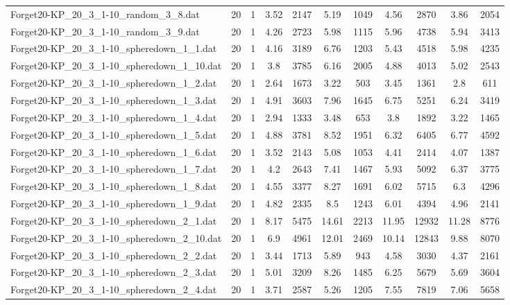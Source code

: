 \begin{table}[!ht]
\begin{tabular}{lcccccccccc}
Forget20-KP\_20\_3\_1-10\_random\_3\_8.dat & 20 & 1 & 3.52 & 2147 & 5.19 & 1049 & 4.56 & 2870 & 3.86 & 2054 \\
Forget20-KP\_20\_3\_1-10\_random\_3\_9.dat & 20 & 1 & 4.26 & 2723 & 5.98 & 1115 & 5.96 & 4738 & 5.94 & 3413 \\
Forget20-KP\_20\_3\_1-10\_spheredown\_1\_1.dat & 20 & 1 & 4.16 & 3189 & 6.76 & 1203 & 5.43 & 4518 & 5.98 & 4235 \\
Forget20-KP\_20\_3\_1-10\_spheredown\_1\_10.dat & 20 & 1 & 3.8 & 3785 & 6.16 & 2005 & 4.88 & 4013 & 5.02 & 2543 \\
Forget20-KP\_20\_3\_1-10\_spheredown\_1\_2.dat & 20 & 1 & 2.64 & 1673 & 3.22 & 503 & 3.45 & 1361 & 2.8 & 611 \\
Forget20-KP\_20\_3\_1-10\_spheredown\_1\_3.dat & 20 & 1 & 4.91 & 3603 & 7.96 & 1645 & 6.75 & 5251 & 6.24 & 3419 \\
Forget20-KP\_20\_3\_1-10\_spheredown\_1\_4.dat & 20 & 1 & 2.94 & 1333 & 3.48 & 653 & 3.8 & 1892 & 3.22 & 1465 \\
Forget20-KP\_20\_3\_1-10\_spheredown\_1\_5.dat & 20 & 1 & 4.88 & 3781 & 8.52 & 1951 & 6.32 & 6405 & 6.77 & 4592 \\
Forget20-KP\_20\_3\_1-10\_spheredown\_1\_6.dat & 20 & 1 & 3.52 & 2143 & 5.08 & 1053 & 4.41 & 2414 & 4.07 & 1387 \\
Forget20-KP\_20\_3\_1-10\_spheredown\_1\_7.dat & 20 & 1 & 4.2 & 2643 & 7.41 & 1467 & 5.93 & 5092 & 6.37 & 3775 \\
Forget20-KP\_20\_3\_1-10\_spheredown\_1\_8.dat & 20 & 1 & 4.55 & 3377 & 8.27 & 1691 & 6.02 & 5715 & 6.3 & 4296 \\
Forget20-KP\_20\_3\_1-10\_spheredown\_1\_9.dat & 20 & 1 & 4.82 & 2335 & 8.5 & 1243 & 6.01 & 4394 & 4.96 & 2141 \\
Forget20-KP\_20\_3\_1-10\_spheredown\_2\_1.dat & 20 & 1 & 8.17 & 5475 & 14.61 & 2213 & 11.95 & 12932 & 11.28 & 8776 \\
Forget20-KP\_20\_3\_1-10\_spheredown\_2\_10.dat & 20 & 1 & 6.9 & 4961 & 12.01 & 2469 & 10.14 & 12843 & 9.88 & 8070 \\
Forget20-KP\_20\_3\_1-10\_spheredown\_2\_2.dat & 20 & 1 & 3.44 & 1713 & 5.89 & 943 & 4.58 & 3030 & 4.37 & 2161 \\
Forget20-KP\_20\_3\_1-10\_spheredown\_2\_3.dat & 20 & 1 & 5.01 & 3209 & 8.26 & 1485 & 6.25 & 5679 & 5.69 & 3604 \\
Forget20-KP\_20\_3\_1-10\_spheredown\_2\_4.dat & 20 & 1 & 3.71 & 2587 & 5.26 & 1205 & 7.55 & 7819 & 7.06 & 5658 \\

\end{tabular}
\end{table}
